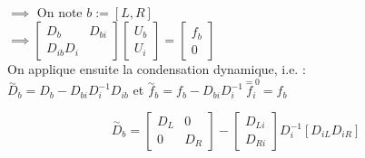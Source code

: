 \documentclass[12pt,a4paper]{article}
\begin{document}
\begin{sol}
		$\implies$ On note $b := [L,R]$\\
		$\implies \left[\begin{matrix}
			D_b & D_{bi} \\
			D_{ib} D_i
		\end{matrix}\right]\left[\begin{matrix}
			U_b \\ U_i
		\end{matrix}\right] = \left[\begin{matrix}
			f_b \\ 0
		\end{matrix}\right]$\\
		On applique ensuite la condensation dynamique, i.e. :\\
		$ \overset\sim D_b = D_b - D_{bi}D_i^{-1}D_{ib}$ et $\overset\sim f_b = f_b-D_{bi}D_i^{-1}\overset{=0}{f_i} = f_b$
		
		\newpage
		
		\[
		\overset\sim D_b = \left[\begin{matrix}
			D_L & 0 \\
			0 & D_R
		\end{matrix}\right] - \left[\begin{matrix}
			D_{Li} \\ D_{Ri}
		\end{matrix}\right]D_i^{-1}\left[D_{iL}D_{iR}\right]
		\]
		

\end{sol}
\end{document}
